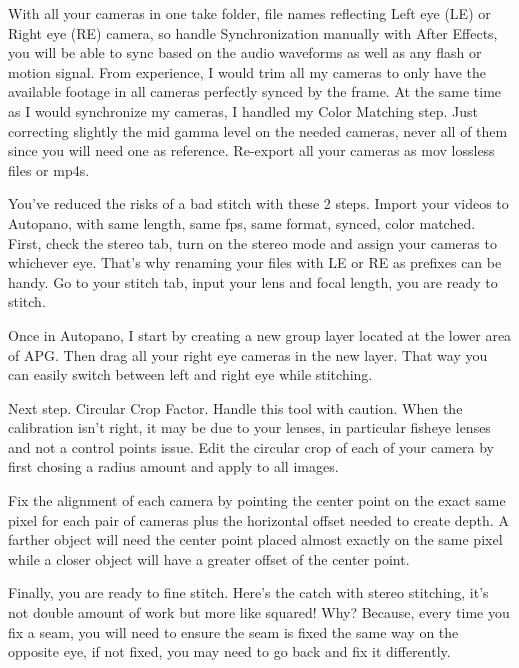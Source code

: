 \begin{fullwidth}
With all your cameras in one take folder, file names reflecting Left eye (LE) or Right eye (RE) camera, so handle Synchronization manually with After Effects, you will be able to sync based on the audio waveforms as well as any flash or motion signal. From experience, I would trim all my cameras to only have the available footage in all cameras perfectly synced by the frame. At the same time as I would synchronize my cameras, I handled my Color Matching step. Just correcting slightly the mid gamma level on the needed cameras, never all of them since you will need one as reference. Re-export all your cameras as mov lossless files or mp4s.


You’ve reduced the risks of a bad stitch with these 2 steps. Import your videos to Autopano, with same length, same fps, same format, synced, color matched. First, check the stereo tab, turn on the stereo mode and assign your cameras to whichever eye. That’s why renaming your files with LE or RE as prefixes can be handy. Go to your stitch tab, input your lens and focal length, you are ready to stitch. 


Once in Autopano, I start by creating a new group layer located at the lower area of APG. Then drag all your right eye cameras in the new layer. That way you can easily switch between left and right eye while stitching.


Next step. Circular Crop Factor. Handle this tool with caution. When the calibration isn't right, it may be due to your lenses, in particular fisheye lenses and not a control points issue. Edit the circular crop of each of your camera by first chosing a radius amount and apply to all images. 


Fix the alignment of each camera by pointing the center point on the exact same pixel for each pair of cameras plus the horizontal offset needed to create depth. A farther object will need the center point placed almost exactly on the same pixel while a closer object will have a greater offset of the center point. 



Finally, you are ready to fine stitch. Here’s the catch with stereo stitching, it’s not double amount of work but more like squared! Why? Because, every time you fix a seam, you will need to ensure the seam is fixed the same way on the opposite eye, if not fixed, you may need to go back and fix it differently. 


\end{fullwidth}

